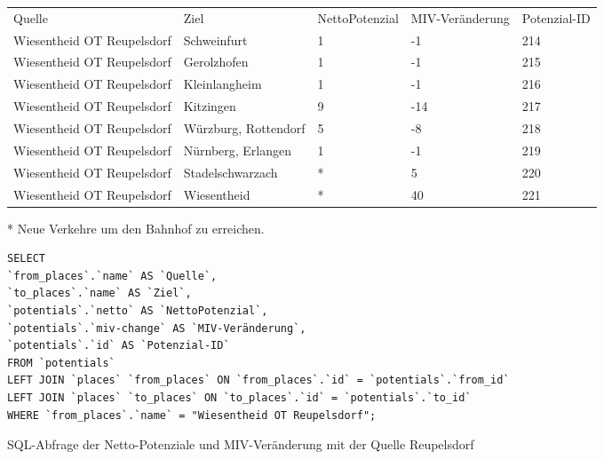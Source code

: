 \begin{tabularx}{\textwidth}{*5{X}}
Quelle & Ziel & NettoPotenzial & MIV-Veränderung & Potenzial-ID\\ 
Wiesentheid OT Reupelsdorf & Schweinfurt & 1 & -1 & 214\\ 
Wiesentheid OT Reupelsdorf & Gerolzhofen & 1 & -1 & 215\\ 
Wiesentheid OT Reupelsdorf & Kleinlangheim & 1 & -1 & 216\\ 
Wiesentheid OT Reupelsdorf & Kitzingen & 9 & -14 & 217\\ 
Wiesentheid OT Reupelsdorf & Würzburg, Rottendorf & 5 & -8 & 218\\ 
Wiesentheid OT Reupelsdorf & Nürnberg, Erlangen & 1 & -1 & 219\\ 
Wiesentheid OT Reupelsdorf & Stadelschwarzach & * & 5 & 220\\ 
Wiesentheid OT Reupelsdorf & Wiesentheid & * & 40 & 221\\ 
\end{tabularx}
\newline
\newline
* Neue Verkehre um den Bahnhof zu erreichen.
\newline
\begin{listing}[htbp]
\begin{verbatim}
SELECT
`from_places`.`name` AS `Quelle`, 
`to_places`.`name` AS `Ziel`, 
`potentials`.`netto` AS `NettoPotenzial`, 
`potentials`.`miv-change` AS `MIV-Veränderung`, 
`potentials`.`id` AS `Potenzial-ID`
FROM `potentials`
LEFT JOIN `places` `from_places` ON `from_places`.`id` = `potentials`.`from_id`
LEFT JOIN `places` `to_places` ON `to_places`.`id` = `potentials`.`to_id`
WHERE `from_places`.`name` = "Wiesentheid OT Reupelsdorf";
\end{verbatim}
\caption{SQL-Abfrage der Netto-Potenziale und MIV-Veränderung mit der Quelle Reupelsdorf}\label{lst-fz-reupelsdorf}
\end{listing}